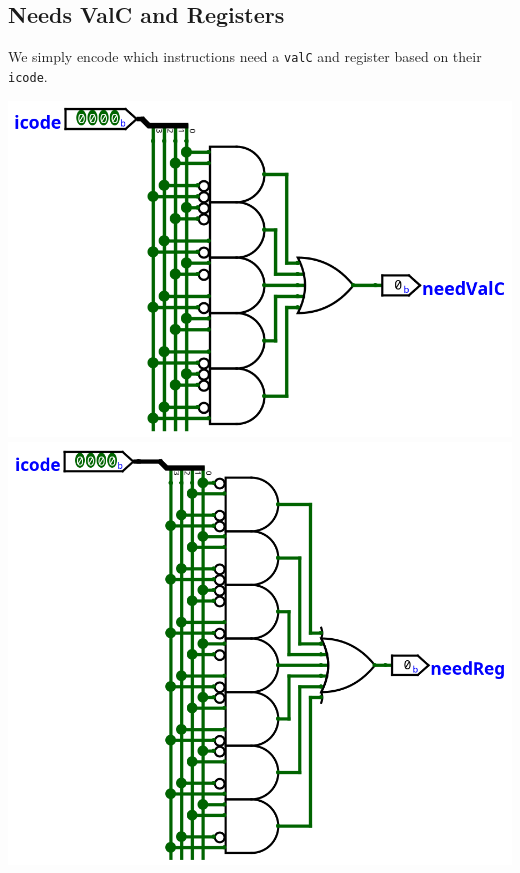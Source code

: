 \documentclass{article}
\begin{document}
\subsection{Needs ValC and Registers}
We simply encode which instructions need a \verb+valC+ and register based on their \verb+icode+. 
\begin{center}
    \includegraphics[scale=.7]{needsValC.png}
    \includegraphics[scale=.7]{needsReg.png}
    \\

\end{center}
\end{document}
